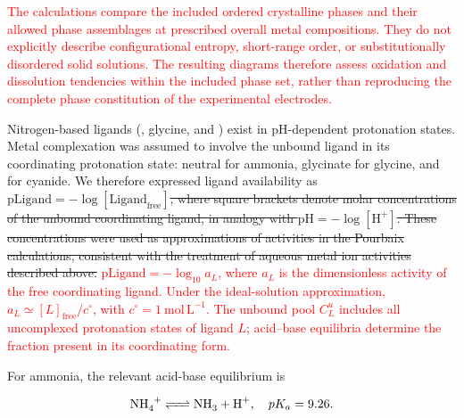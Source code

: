 \documentclass[twoside,twocolumn,9pt]{article}
\begin{document}
\textcolor{red}{The calculations compare the included ordered crystalline phases and their allowed phase assemblages at prescribed overall metal compositions. They do not explicitly describe configurational entropy, short-range order, or substitutionally disordered solid solutions. The resulting diagrams therefore assess oxidation and dissolution tendencies within the included phase set, rather than reproducing the complete phase constitution of the experimental electrodes.}

Nitrogen-based ligands (, glycine, and ) exist in pH-dependent protonation states. Metal complexation was assumed to involve the unbound ligand in its coordinating protonation state: neutral  for ammonia, glycinate for glycine, and  for cyanide. We therefore expressed ligand availability as
\sout{\(\mathrm{pLigand} = -\log[\mathrm{Ligand}_{\mathrm{free}}]\), where square brackets denote molar concentrations of the unbound coordinating ligand, in analogy with $\text{pH} = -\log[\text{H}^+]$. These concentrations were used as approximations of activities in the Pourbaix calculations, consistent with the treatment of aqueous metal ion activities described above.} \textcolor{red}{$\mathrm{pLigand}=-\log_{10}a_L$, where $a_L$ is the dimensionless activity of the free coordinating ligand. Under the ideal-solution approximation, $a_L\simeq[L]_{\mathrm{free}}/c^\circ$, with $c^\circ=1~\mathrm{mol\,L^{-1}}$. The unbound pool $C_L^u$ includes all uncomplexed protonation states of ligand $L$; acid--base equilibria determine the fraction present in its coordinating form.}


For ammonia, the relevant acid-base equilibrium is

\begin{equation} \label{eq:NH4_equilibrium}
    \ce{NH4+ <=> NH3 + H+}, \quad pK_a = 9.26 .
\end{equation}
\end{document}
